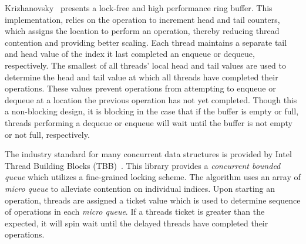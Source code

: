 Krizhanovsky~\cite{krizhanovsky_queue} presents a lock-free and high performance ring buffer.
This implementation, relies on the  operation to increment head and tail counters, which assigns the location to perform an operation, thereby reducing thread contention and providing better scaling.
Each thread maintains a separate tail and head value of the index it last completed an enqueue or dequeue, respectively. 
The smallest of all threads' local head and tail values are used to determine the head and tail value at which all threads have completed their operations.
These values prevent operations from attempting to enqueue or dequeue at a location the previous operation has not yet completed.
Though this a non-blocking design, it is blocking in the case that if the buffer is empty or full, threads performing a dequeue or enqueue will wait until the buffer is not empty or not full, respectively.

The industry standard for many concurrent data structures is provided by Intel Thread Building Blocks (TBB)~\cite{tbb}.
This library provides a \emph{concurrent bounded queue} which utilizes a fine-grained locking scheme.
The algorithm uses an array of \emph{micro queue} to alleviate contention on individual indices.
Upon starting an operation, threads are assigned a ticket value which is used to determine sequence of operations in each \emph{micro queue}.
If a threads ticket is greater than the expected, it will spin wait until the delayed threads have completed their operations.




